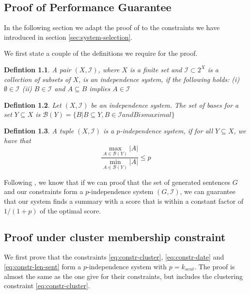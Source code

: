 \documentclass[a4paper,BCOR=10mm]{report}
\numberwithin{lemma}{chapter}
\newtheorem{definition}{Defintion}
\numberwithin{definition}{chapter}
\begin{document}
\begin{appendices}
\chapter{Proof of Performance Guarantee}

In the following section we adapt the proof of \citet{markert} to the constraints we have introduced in section \ref{sec:system-selection}.

We first state a couple of the definitions we require for the proof.

\begin{definition}
A pair $(X, \mathcal{I})$, where $X$ is a finite set and $\mathcal{I} \subset 2^X$ is a collection of subsets of $X$, is an independence system, if the following holds: (i) $\emptyset \in \mathcal{I}$ (ii) $B \in \mathcal{I}$ and $A \subseteq B$ implies $A \in \mathcal{I}$
\end{definition}

\begin{definition}
Let $(X, \mathcal{I})$ be an independence system. The set of bases for a set $Y \subseteq X$ is $\mathcal{B}(Y) = \{B | B \subseteq Y, B \in \mathcal{I} \mathit{ and } B \mathit{ is maximal} \}$
\end{definition}


\begin{definition}
A tuple $(X, \mathcal{I})$ is a $p$-independence system, if for all $Y \subseteq X$, we have that
\begin{equation}
 \frac{\max_{A \in \mathcal{B}(Y)} |A|}{\min_{A \in \mathcal{B}(Y)} |A|} \leq p
\end{equation}
\end{definition}

Following \citet{markert}, we know that if we can proof that the set of generated sentences $G$ and our constraints form a $p$-independence system $(G, \mathcal{I})$, we can guarantee that our system finds a summary with a score that is within a constant factor of $1 / (1 + p)$ of the optimal score.

\section{Proof under cluster membership constraint}

We first prove that the constraints \ref{eq:constr-cluster}, \ref{eq:constr-date} and \ref{eq:constr-len-sent} form a $p$-independence system with $p = k_{sent}$.
The proof is almost the same as the one \citet{markert} give for their constraints, but includes the clustering constraint \ref{eq:constr-cluster}.


\end{appendices}
\end{document}
